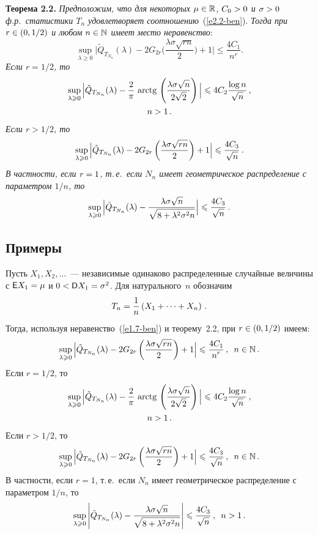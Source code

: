 \begin{multicols}{2}
\smallskip

\noindent
\textbf{Теорема 2.2.} \textit{Предположим, что для некоторых $\mu\hm\in\r$,
$C_0\hm>0$ и $\sigma\hm>0$ ф.р.\ статистики $T_{n}$ удовлетворяет
соотношению}~(\ref{e2.2-ben}). \textit{Тогда при $r\hm\in(0,1/2)$ и любом $n\hm\in\N$
имеет место неравенство}:
$$
\sup_{\lambda\geqslant 0}\Big|\tilde Q_{T_{N_n}}(\lambda)-
2G_{2r}\Big(\frac{\lambda\sigma \sqrt{rn}}{2}\Big)+1\Big|\leqslant
\frac{4C_1}{n^{r}}.
$$
\textit{Если $r=1/2$, то
\begin{multline*}
\sup\limits_{\lambda\geqslant 0}\Big|\tilde Q_{T_{N_n}}(\lambda)-
\displaystyle\frac{\displaystyle 2\mathstrut}{\displaystyle \pi\mathstrut}\,\,\mathrm{arctg}\,\left(\displaystyle\frac{\displaystyle \lambda\sigma \sqrt
n\mathstrut}{\displaystyle 2\sqrt{2}\mathstrut}\right)\Big|\leqslant 4C_2\displaystyle\frac{\displaystyle \log n\mathstrut}{\displaystyle \sqrt{n}\mathstrut}\,,\\ n> 1\,.
\end{multline*}
Если $r>1/2$, то
$$
\sup\limits_{\lambda\geqslant 0}\Big|\tilde Q_{T_{N_n}}(\lambda)-
2G_{2r}\left(\displaystyle\frac{\displaystyle \lambda\sigma \sqrt{rn}\mathstrut}{\displaystyle 2\mathstrut}\right)+1\Big|\leqslant
\displaystyle\frac{\displaystyle 4C_3\mathstrut}{\displaystyle \sqrt{n}\mathstrut}\,.
$$
В частности, если $r\hm=1$, т.\,е.\ если $N_n$ имеет гео\-мет\-ри\-че\-ское
распределение с параметром $1/n$, то}
$$
\sup\limits_{\lambda\geqslant 0}\Big|\tilde Q_{T_{N_n}}(\lambda)-
\displaystyle\frac{\displaystyle \lambda\sigma \sqrt{n}\mathstrut}{\displaystyle \sqrt{8+\lambda^2\sigma^2 n}\mathstrut}\Big| \leqslant
\displaystyle\frac{\displaystyle 4C_3\mathstrut}{\displaystyle \sqrt{n}\mathstrut}\,.
$$

\subsection{Примеры}

Пусть $X_1,X_2,\ldots$~--- независимые одинаково распределенные
случайные величины с ${\sf E}X_1\hm=\mu$ и $0\hm<{\sf D}X_1\hm=\sigma^2$. Для
натурального~$n$ обозначим
$$
T_n=\displaystyle\frac{\displaystyle 1\mathstrut}{\displaystyle n\mathstrut}\left(X_1+\cdots+X_n\right)\,.
$$
Тогда, используя неравенство~(\ref{e1.7-ben}) и теорему~2.2, при
$r\hm\in(0,1/2)$ имеем:
$$
\sup\limits_{\lambda\geqslant 0}\Big|\tilde Q_{T_{N_n}}(\lambda)-
2G_{2r}\left(\displaystyle\frac{\displaystyle \lambda\sigma\sqrt{rn}\mathstrut}{\displaystyle 2\mathstrut}\right)+1\Big|\leqslant
\displaystyle\frac{\displaystyle 4C_1\mathstrut}{\displaystyle n^{r}\mathstrut}\,,\enskip n\in\mathbb N\,.
$$
Если $r=1/2$, то
\begin{multline*}
\sup\limits_{\lambda\geqslant 0}\Big|\tilde Q_{T_{N_n}}(\lambda)-
\displaystyle\frac{\displaystyle 2\mathstrut}{\displaystyle \pi\mathstrut}\,\,\mathrm{arctg}\,\left(\displaystyle\frac{\displaystyle \lambda\sigma\sqrt
n\mathstrut}{\displaystyle 2\sqrt{2}\mathstrut}\right)\Big|\leqslant 4C_2\displaystyle\frac{\displaystyle \log n\mathstrut}{\displaystyle \sqrt{n}\mathstrut}\,,\\ n > 1\,.
\end{multline*}
Если $r>1/2$, то
$$
\sup\limits_{\lambda\geqslant 0}\Big|\tilde Q_{T_{N_n}}(\lambda)-
2G_{2r}\left(\displaystyle\frac{\displaystyle \lambda\sigma\sqrt{rn}\mathstrut}{\displaystyle 2\mathstrut}\right)+1\Big|\leqslant
\displaystyle\frac{\displaystyle 4C_3\mathstrut}{\displaystyle \sqrt{n}\mathstrut}\,,\enskip n\in\mathbb N\,.
$$
В частности, если $r=1$, т.\,е.\ если $N_n$ имеет гео\-мет\-ри\-че\-ское
распределение с параметром $1/n$, то
$$
\sup\limits_{\lambda\geqslant 0}\left\vert\tilde Q_{T_{N_n}}(\lambda)-
\displaystyle\frac{\displaystyle \lambda\sigma \sqrt{n}\mathstrut}{\displaystyle \sqrt{8+\lambda^2\sigma^2 n}\mathstrut}\right\vert \leqslant
\displaystyle\frac{\displaystyle 4C_3\mathstrut}{\displaystyle \sqrt{n}\mathstrut}\,,\enskip n>1\,.
$$


\end{multicols}
